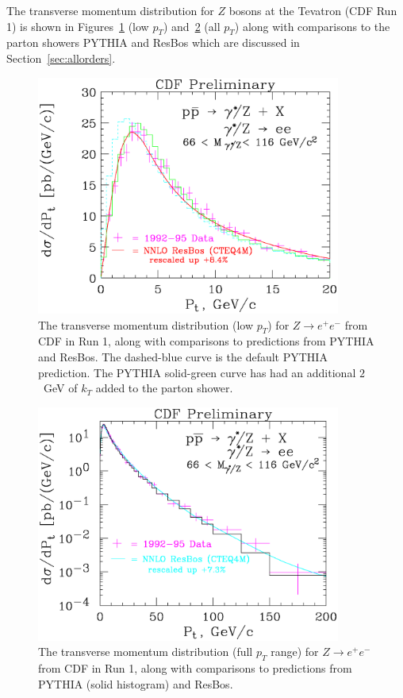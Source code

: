\documentclass[12pt]{iopart}
\begin{document}
The transverse momentum distribution for $Z$ bosons at the Tevatron (CDF Run 1) is shown in Figures~\ref{fig:run1ee}
(low $p_T$) and~\ref{fig:zptall} (all $p_T$) along with comparisons to the parton showers PYTHIA and ResBos which are
discussed in Section~\ref{sec:allorders}.
%
\begin{figure}[t]
\begin{center}
\includegraphics[width=10cm]{run1ee_pyt.ps}
\end{center}
\caption{
The transverse momentum distribution (low $p_T$) for $Z \rightarrow e^+e^-$ from CDF in Run 1, along with comparisons to predictions
from PYTHIA and ResBos. The dashed-blue curve is the default PYTHIA prediction. The PYTHIA solid-green curve has had an
additional $2$~GeV of $k_T$ added to the parton shower.
\label{fig:run1ee}}
\end{figure}
%
%
\begin{figure}[t]
\begin{center}
\includegraphics[width=10cm]{zpteeall.ps}
\end{center}
\caption{
The transverse momentum distribution (full $p_T$ range) for $Z \rightarrow e^+e^-$ from CDF in Run 1, along with comparisons to
predictions from PYTHIA (solid histogram) and ResBos. 
\label{fig:zptall}}
\end{figure}
\end{document}

